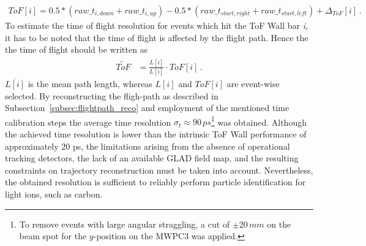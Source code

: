 \begin{align*}
ToF[i] = 0.5*(raw\_t_{i,down}+raw\_t_{i,up}) - 0.5*(raw\_t_{start,right}+raw\_t_{start,left}) + \Delta_{ToF}[i] \, .
\end{align*}  
To estimate the time of flight resolution for events which hit the ToF Wall bar \textit{i}, it has to be noted that the time of flight is affected by the flight path. Hence the the time of flight should be written as
\begin{align*}
\widetilde{ToF} &= \frac{\overline{L[i]}}{L[i]} \cdot ToF[i] \, .
\end{align*}
$\overline{L[i]}$ is the mean path length, whereas $L[i]$ and $ToF[i]$ are event-wise selected.
By reconstructing the fligh-path as described in Subsection~\ref{subsec:flightpath_reco} and employment of the mentioned time calibration steps the average time resolution $\sigma_t \approx 90\, ps$\footnote{To remove events with large angular straggling, a cut of $\pm 20\,mm$ on the beam spot for the $y$-position on the MWPC3 was applied.} was obtained. Although the achieved time resolution is lower than the intrinsic ToF Wall performance of approximately 20 ps, the limitations arising from the absence of operational tracking detectors, the lack of an available GLAD field map, and the resulting constraints on trajectory reconstruction must be taken into account. Nevertheless, the obtained resolution is sufficient to reliably perform particle identification for light ions, such as carbon.


